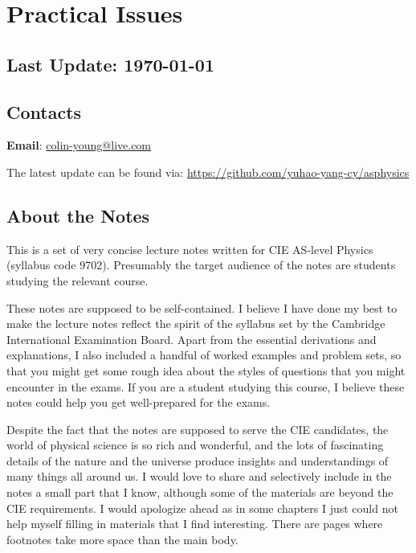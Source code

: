 \section*{Practical Issues}

\subsection*{Last Update: \today}


\subsection*{Contacts}
\textbf{Email}: \url{colin-young@live.com}

The latest update can be found via: \url{https://github.com/yuhao-yang-cy/asphysics}

\subsection*{About the Notes}

This is a set of very concise lecture notes written for CIE AS-level Physics (syllabus code 9702). Presumably the target audience of the notes are students studying the relevant course.

These notes are supposed to be self-contained. I believe I have done my best to make the lecture notes reflect the spirit of the syllabus set by the Cambridge International Examination Board. Apart from the essential derivations and explanations, I also included a handful of worked examples and problem sets, so that you might get some rough idea about the styles of questions that you might encounter in the exams. If you are a student studying this course, I believe these notes could help you get well-prepared for the exams.

Despite the fact that the notes are supposed to serve the CIE candidates, the world of physical science is so rich and wonderful, and the lots of fascinating details of the nature and the universe produce insights and understandings of many things all around us. I would love to share and selectively include in the notes a small part that I know, although some of the materials are beyond the CIE requirements. I would apologize ahead as in some chapters I just could not help myself filling in materials that I find interesting. There are pages where footnotes take more space than the main body.

